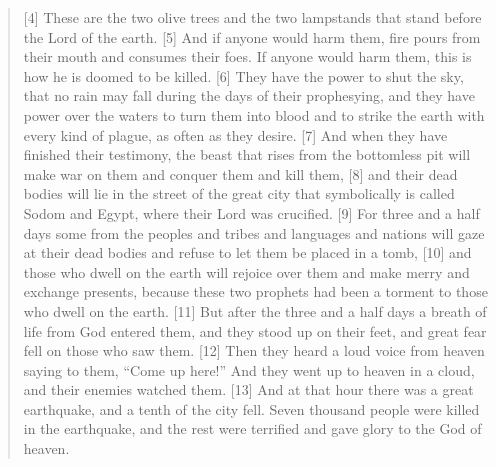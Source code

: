 \begin{quote}
    [4] These are the two olive trees and the two lampstands that stand
    before the Lord of the earth.  [5] And if anyone would harm them, fire
    pours from their mouth and consumes their foes.  If anyone would harm
    them, this is how he is doomed to be killed.  [6] They have the power to
    shut the sky, that no rain may fall during the days of their prophesying,
    and they have power over the waters to turn them into blood and to strike
    the earth with every kind of plague, as often as they desire.  [7] And
    when they have finished their testimony, the beast that rises from the
    bottomless pit will make war on them and conquer them and kill them, [8]
    and their dead bodies will lie in the street of the great city that
    symbolically is called Sodom and Egypt, where their Lord was crucified.
    [9] For three and a half days some from the peoples and tribes and
    languages and nations will gaze at their dead bodies and refuse to let
    them be placed in a tomb, [10] and those who dwell on the earth will
    rejoice over them and make merry and exchange presents, because these two
    prophets had been a torment to those who dwell on the earth.  [11] But
    after the three and a half days a breath of life from God entered them,
    and they stood up on their feet, and great fear fell on those who saw
    them.  [12] Then they heard a loud voice from heaven saying to them,
    “Come up here!” And they went up to heaven in a cloud, and their enemies
    watched them.  [13] And at that hour there was a great earthquake, and a
    tenth of the city fell.  Seven thousand people were killed in the
    earthquake, and the rest were terrified and gave glory to the God of
    heaven.
  \end{quote}
